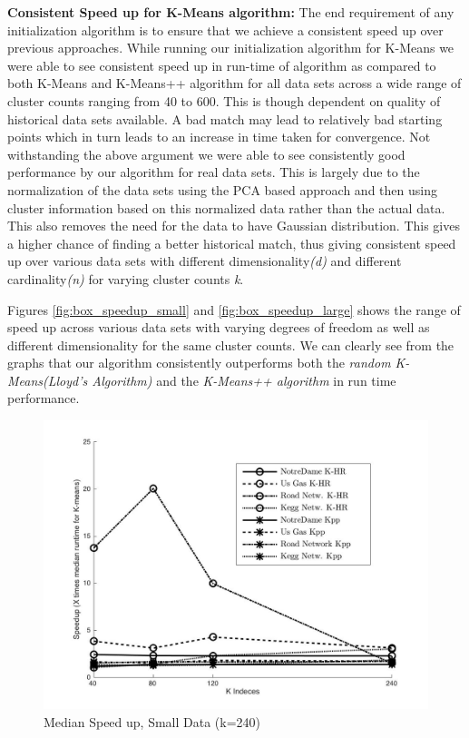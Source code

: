 \documentclass{vldb}
\begin{document}
\textbf{Consistent Speed up for K-Means algorithm:} The end requirement of any initialization algorithm is to ensure that we achieve a consistent speed up over previous approaches. While running our initialization algorithm for K-Means we were able to see consistent speed up in run-time of algorithm as compared to both K-Means and K-Means++ algorithm for all data sets across a wide range of cluster counts ranging from 40 to 600. This is though dependent on quality of historical data sets available. A bad match may lead to relatively bad starting points which in turn leads to an increase in time taken for convergence. Not withstanding the above argument we were able to see consistently good performance by our algorithm for real data sets. This is largely due to the normalization of the data sets using the PCA based approach and then using cluster information based on this normalized data rather than the actual data. This also removes the need for the data to have Gaussian distribution. This gives a higher chance of finding a better historical match, thus giving consistent speed up over various data sets with different dimensionality\textit{(d)} and different cardinality\textit{(n)} for varying cluster counts \textit{k}.

Figures \ref{fig:box_speedup_small} and \ref{fig:box_speedup_large} shows the range of speed up across various data sets with varying degrees of freedom as well as different dimensionality for the same cluster counts. We can clearly see from the graphs that our algorithm consistently outperforms both the \textit{random K-Means(Lloyd’s Algorithm)} and the \textit{K-Means++ algorithm} in run time performance.


\begin{figure}[p!]
    \includegraphics[width=\textwidth]{k_means_speedup_line_small}
    \caption{Median Speed up, Small Data (k=240)}
    \centering
    \label{fig:line_speedup_small}
\end{figure}
\end{document}
